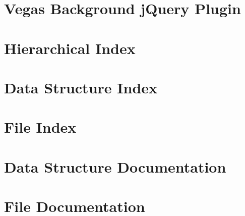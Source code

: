 \let\mypdfximage\pdfximage\def\pdfximage{\immediate\mypdfximage}\documentclass[twoside]{book}
\newcommand{\+}{\discretionary{\mbox{\scriptsize$\hookleftarrow$}}{}{}}
\newcommand{\clearemptydoublepage}{%
  \newpage{\pagestyle{empty}\cleardoublepage}%
}
\begin{document}
\chapter{Vegas Background j\+Query Plugin}
\label{md__c_1__users__janbl__documents__git_hub__proj_src_view_content_site_scripts_vegas__r_e_a_d_m_e}

\chapter{Hierarchical Index}

\chapter{Data Structure Index}

\chapter{File Index}

\chapter{Data Structure Documentation}

\chapter{File Documentation}














\backmatter
\newpage
{}
\clearemptydoublepage
{}
\printindex
\end{document}
